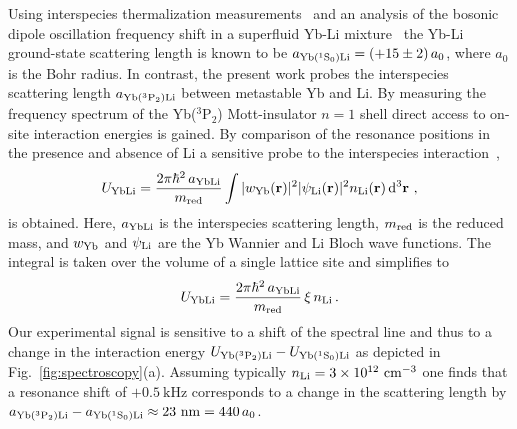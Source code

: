 \documentclass[twocolumn,superscriptaddress,showpacs,floatfix,amsmath,amssymb]{revtex4-1}
\newcommand{\singlet}{{}^1\mathrm{S}_0}
\newcommand{\triplet}{{}^3\mathrm{P}_2}
\newcommand{\cm}{\mathrm{cm}}
\newcommand{\nm}{\mathrm{nm}}
\newcommand{\kHz}{\mathrm{kHz}}
\begin{document}
Using interspecies thermalization measurements~\cite{ivanov_sympathetic_2011,
hara_quantum_2011} and an analysis of the bosonic dipole oscillation frequency
shift in a superfluid Yb-Li mixture~\cite{roy_two-element_2017} the Yb-Li
ground-state scattering length is known to be $a_{{\rm Yb}(\singlet){\rm Li}}
= (+15 \pm 2)\,a_0$, where $a_0$ is the Bohr radius. In contrast, the present
work probes the interspecies scattering length $a_{{\rm Yb}(\triplet){\rm
Li}}$ between metastable Yb and Li. By measuring the frequency spectrum of the
Yb($\triplet$) Mott-insulator $n=1$ shell direct access to on-site interaction
energies is gained. By comparison of the resonance positions in the presence
and absence of Li a sensitive probe to the interspecies
interaction~\cite{bloch_many-body_2008},
\begin{equation}
	U_{\rm YbLi} = \frac{2\pi \hbar^2\, a_{\rm YbLi}}{m_{\rm red}} 
	\int |w_{\rm Yb}({\bf r})|^2 |\psi_{\rm Li}({\bf r})|^2 n_{\rm Li}({\bf r})\,
	{\rm d}^3{\bf r}\ ,
	\label{eqn:Ufull}
\end{equation}
is obtained. Here, $a_{\rm YbLi}$ is the interspecies scattering length,
$m_{\rm red}$ is the reduced mass, and $w_{\rm Yb}$ and $\psi_{\rm Li}$ are
the Yb Wannier and Li Bloch wave functions. The integral is taken over the
volume of a single lattice site and simplifies to
\begin{equation}
	U_{\rm YbLi} = \frac{2\pi \hbar^2\, a_{\rm YbLi}}{m_{\rm red}}\, \xi\,
	n_{\rm Li}\, .
	\label{eqn:Usimpl}
\end{equation}
Our experimental signal is sensitive to a shift of the spectral line and thus
to a change in the interaction energy $U_{{\rm Yb}(\triplet){\rm Li}} -
U_{{\rm Yb}(\singlet){\rm Li}}$ as depicted in Fig.~\ref{fig:spectroscopy}(a).
Assuming typically $n_{\rm Li} = 3 \times 10^{12}~\cm^{-3}$ one finds that a
resonance shift of $+0.5~\kHz$ corresponds to a change in the scattering
length by $a_{{\rm Yb}(\triplet){\rm Li}} - a_{{\rm Yb}(\singlet){\rm Li}}
\approx 23~\nm = 440\,a_0 $.
\end{document}
